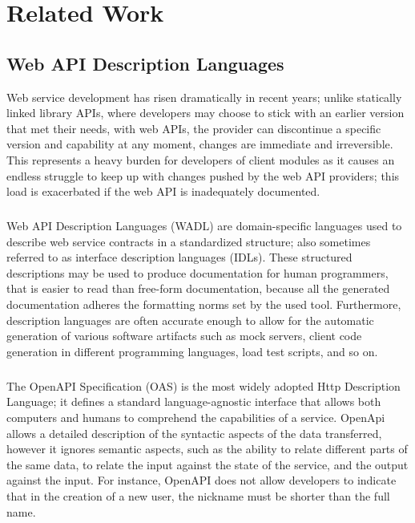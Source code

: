 
%

\chapter{Related Work}
\label{cha:related_work}

\section{Web API Description Languages} %
\label{sec:web_api_description_languages}

Web service development has risen dramatically in recent years;  unlike statically linked library APIs,
where developers may choose to stick with an earlier version that met their needs, with web APIs,
the provider can discontinue a specific version and capability at any moment, changes are immediate and irreversible.
This represents a heavy burden for developers of client modules as it causes an endless struggle to keep up
with changes pushed by the web API providers; this load is exacerbated if the web API is inadequately documented.
\paragraph{}
Web API Description Languages (WADL) are domain-specific languages used to describe web service contracts in a standardized structure;
also sometimes referred to as interface description languages (IDLs).
These structured descriptions may be used to produce documentation for human programmers, that is easier to read than free-form documentation,
because all the generated documentation adheres the formatting norms set by the used tool.
Furthermore, description languages are often accurate enough to allow for the automatic generation of various software artifacts such as mock servers,
client code generation in different programming languages, load test scripts, and so on.

\paragraph{}

The OpenAPI Specification (OAS) \cite{openAPI} is the most widely adopted Http Description Language;
it defines a standard language-agnostic interface that allows both computers and humans to comprehend the capabilities of a service.
OpenApi allows a detailed description of the syntactic aspects of the data transferred, however it ignores semantic aspects, such as the ability to relate
different parts of the same data, to relate the input against the state of the service, and the output against the input.
For instance, OpenAPI does not allow developers to indicate that in the creation of a new user, the nickname must be shorter
than the full name.

